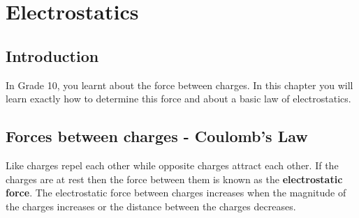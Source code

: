 \chapter{Electrostatics}
\label{p:em:es11}

\section{Introduction}
In Grade 10, you learnt about the force between charges. In this
chapter you will learn exactly how to determine this force and
about a basic law of electrostatics.


\section{Forces between charges - Coulomb's Law}

Like charges repel each other while opposite charges attract each other. If the charges are at rest then the force between
them is known as the \textbf{electrostatic force}. The
electrostatic force between charges increases when the magnitude
of the charges increases or the distance between the charges
decreases.\\

